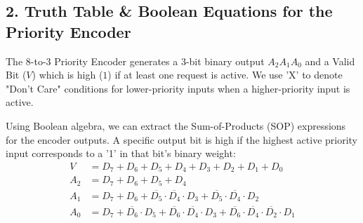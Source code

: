 \documentclass[12pt,a3paper]{article}
\begin{document}
\begin{enumerate}
\begin{tcolorbox}[enhanced,breakable,ansbox,colback=cD!4,colframe=cD,boxrule=0.8pt,arc=5pt,title={\textbf{Answer}},fonttitle=\bfseries\color{white},colbacktitle=cD]
\subsection*{2. Truth Table \& Boolean Equations for the Priority Encoder}

The 8-to-3 Priority Encoder generates a 3-bit binary output $A_2 A_1 A_0$ and a Valid Bit ($V$) which is high ($1$) if at least one request is active. We use 'X' to denote "Don't Care" conditions for lower-priority inputs when a higher-priority input is active.

\begin{center}
\renewcommand{\arraystretch}{1.1}
\end{center}

Using Boolean algebra, we can extract the Sum-of-Products (SOP) expressions for the encoder outputs. A specific output bit is high if the highest active priority input corresponds to a '1' in that bit's binary weight:
\begin{align*}
    V &= D_7 + D_6 + D_5 + D_4 + D_3 + D_2 + D_1 + D_0 \\
    A_2 &= D_7 + D_6 + D_5 + D_4 \\
    A_1 &= D_7 + D_6 + \overline{D_5} \cdot \overline{D_4} \cdot D_3 + \overline{D_5} \cdot \overline{D_4} \cdot D_2 \\
    A_0 &= D_7 + \overline{D_6} \cdot D_5 + \overline{D_6} \cdot \overline{D_4} \cdot D_3 + \overline{D_6} \cdot \overline{D_4} \cdot \overline{D_2} \cdot D_1
\end{align*}


\end{tcolorbox}
\end{enumerate}
\end{document}
